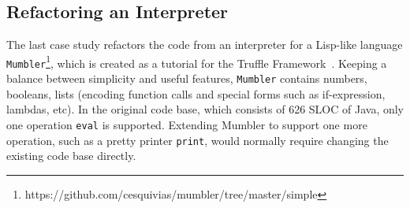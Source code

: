 \subsection{Refactoring an Interpreter}\label{subsec:int}
\begin{comment}
The last case study refactors the code from an interpreter for
a Lisp-like language
\lstinline{Mumbler}\footnote{https://github.com/cesquivias/mumbler/tree/master/simple},
which is created as a tutorial for the Truffle
Framework~\cite{wurthinger2013one}.  Keeping a balance between
simplicity and useful features, \lstinline{Mumbler} contains numbers,
booleans, lists (encoding function calls and special forms such as
if-expression, lambdas, etc). In the original code base, which
consists of 626 SLOC of Java, only one operation \texttt{eval} is
supported. Extending Mumbler to support one more operation, such as a
pretty printer (making it 661 SLOC), would normally require changing the existing code base
directly.

Our refactoring applies the pattern presented in
Section~\ref{subsec:ep} to the existing Mumbler code base to improve
its modularity and extensibility. Using the refactored code base (560 SLOC) it is 
becomes possible to add new operations modularly, and to support
independent extensibility (677 SLOC). We add one more
operation \texttt{print} to both the original and the refactored code
base. In the original code base the pretty printer is added
non-modularly by modifying the existing code. In the refactored code
base the pretty printer is added modularly. 
Although the code in the refactored version is slightly increased (by 2.4\% SLOC), the
modularity is greatly increased, allowing for improved reusability and maintainability.
\end{comment}

The last case study refactors the code from an interpreter for
a Lisp-like language
\lstinline{Mumbler}\footnote{https://github.com/cesquivias/mumbler/tree/master/simple},
which is created as a tutorial for the Truffle
Framework~\cite{wurthinger2013one}.  Keeping a balance between
simplicity and useful features, \lstinline{Mumbler} contains numbers,
booleans, lists (encoding function calls and special forms such as
if-expression, lambdas, etc). In the original code base, which
consists of 626 SLOC of Java, only one operation \texttt{eval} is
supported. Extending Mumbler to support one more operation, such as a
pretty printer \texttt{print}, would normally require changing the existing code base
directly.

